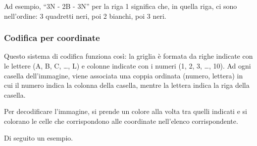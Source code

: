 Ad esempio, ``3N - 2B - 3N'' per la riga 1 significa che, in quella riga, ci sono nell'ordine: 3 quadretti neri, poi 2 bianchi, poi 3 neri.

\subsubsection{Codifica per coordinate}


Questo sistema di codifica funziona così: la griglia è formata da righe indicate con le lettere (A, B, C, \ldots, L) e colonne indicate con i numeri (1, 2, 3, \ldots, 10). Ad ogni casella dell'immagine, viene associata una coppia ordinata (numero, lettera) in cui il numero indica la colonna della casella, mentre la lettera indica la riga della casella.

Per decodificare l'immagine, si prende un colore alla volta tra quelli indicati e si colorano le celle che corrispondono alle coordinate nell'elenco corrispondente.

Di seguito un esempio.


